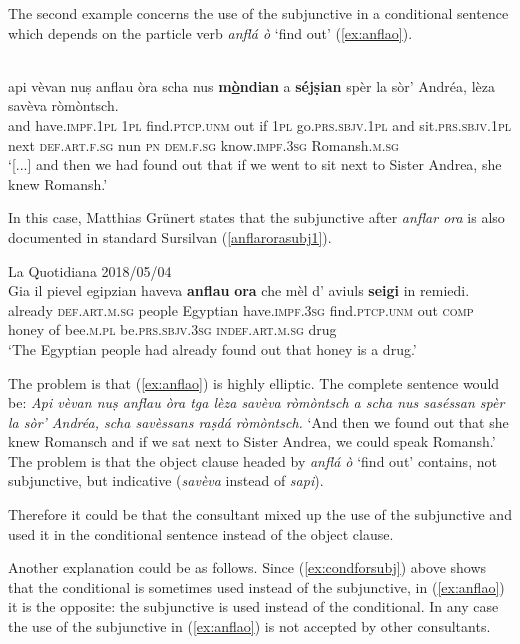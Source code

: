 The second example concerns the use of the subjunctive in a conditional sentence which depends on the particle verb \textit{anflá ò} `find out' (\ref{ex:anflao}). 


\ea
\label{ex:anflao}
\\
\gll   [...] api vèvan nuṣ anflau òra scha nus \textbf{m\underline{ò}ndian} a \textbf{séjṣian} spèr la sòr’ Andréa, lèza savèva ròmòntsch.\\
{} and have.\textsc{impf.1pl} \textsc{1pl}  find.\textsc{ptcp.unm} out if \textsc{1pl} go.\textsc{prs.sbjv.1pl} and sit.\textsc{prs.sbjv.1pl} next  \textsc{def.art.f.sg} nun \textsc{pn} \textsc{dem.f.sg} know.\textsc{impf.3sg} Romansh.\textsc{m.sg}\\
\glt `[...] and then we had found out that if we went to sit next to Sister Andrea, she knew Romansh.'
\z

In this case, Matthias Grünert states that the subjunctive after \textit{anflar ora} is also documented in standard Sursilvan (\ref{anflarorasubj1}).

\ea
\label{anflarorasubj1}
 {La Quotidiana 2018/05/04}\\
\gll Gia il pievel egipzian haveva \textbf{anflau} \textbf{ora} che mèl d’ aviuls \textbf{seigi} in remiedi.\\
already \textsc{def.art.m.sg} people Egyptian have.\textsc{impf.3sg} find.\textsc{ptcp.unm} out \textsc{comp} honey of bee.\textsc{m.pl} be.\textsc{prs.sbjv.3sg} \textsc{indef.art.m.sg} drug\\
\glt `The Egyptian people had already found out that honey is a drug.'
\z

The problem is that (\ref{ex:anflao}) is highly elliptic. The complete sentence would be: \textit{Api vèvan nuṣ anflau òra tga lèza savèva ròmòntsch a scha nus saséssan spèr la sòr' Andréa, scha savèssans raṣdá ròmòntsch.} `And then we found out that she knew Romansch and if we sat next to Sister Andrea, we could speak Romansh.' The problem is that the object clause headed by \textit{anflá ò} `find out' contains, not subjunctive, but indicative (\textit{savèva} instead of \textit{sapi}).

Therefore it could be that the consultant mixed up the use of the subjunctive and used it in the conditional sentence instead of the object clause.

Another explanation could be as follows. Since (\ref{ex:condforsubj}) above shows that the conditional is sometimes used instead of the subjunctive, in (\ref{ex:anflao}) it is the opposite: the subjunctive is used instead of the conditional. In any case the use of the subjunctive in (\ref{ex:anflao}) is not accepted by other consultants.

